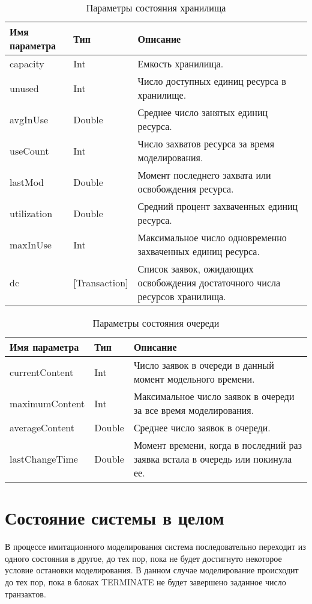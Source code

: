 \begin{table}
\caption{Параметры состояния хранилища}
\label{tab:storState}
\begin{tabular}{|l|l|p{}|}
\hline
Имя параметра & Тип & Описание \\
\hline
capacity & Int & Емкость хранилища.\\
\hline
unused & Int & Число доступных единиц ресурса в хранилище.\\
\hline
avgInUse & Double & Среднее число занятых единиц ресурса.\\
\hline
useCount & Int & Число захватов ресурса за время моделирования.\\
\hline
lastMod & Double & Момент последнего захвата или освобождения ресурса.\\
\hline
utilization & Double &Средний процент захваченных единиц ресурса.\\
\hline
maxInUse & Int & Максимальное число одновременно захваченных единиц ресурса. \\
\hline
dc & [Transaction] & Список заявок, ожидающих освобождения достаточного числа ресурсов хранилища. \\
\hline
\end{tabular}
\end{table}


\begin{table}
\caption{Параметры состояния очереди}
\label{tab:queueState}
\begin{tabular}{|l|l|p{}|}
\hline
Имя параметра & Тип & Описание \\
\hline
currentContent & Int & Число заявок в очереди в данный момент модельного времени.\\
\hline
maximumContent & Int & Максимальное число заявок в очереди за все время моделирования.\\
\hline
averageContent & Double & Среднее число заявок в очереди.\\
\hline
lastChangeTime & Double & Момент времени, когда в последний раз заявка встала в очередь или покинула ее.\\
\hline
\end{tabular}
\end{table}


\section{Состояние системы в целом}

В процессе имитационного моделирования система последовательно переходит из одного состояния в другое, до тех пор, пока не будет достигнуто некоторое условие остановки моделирования. В данном случае моделирование происходит до тех пор, пока в блоках TERMINATE не будет завершено заданное число транзактов.

